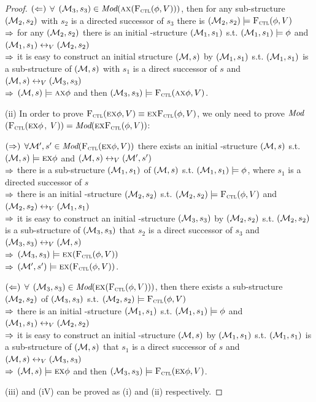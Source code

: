 \documentclass[letterpaper]{article} %
\begin{document}
\begin{proof}
$(\Leftarrow)$ $\forall$ $({\cal M}_3, s_3) \in \textit{Mod}(\textsc{a} \textsc{x} ({\textsc{F}_{\textsc{ctl}}}(\phi,V)))$, then for any sub-structure $({\cal M}_2, s_2)$ with $s_2$ is a directed successor of $s_3$ there is $({\cal M}_2, s_2) \models {\textsc{F}_{\textsc{ctl}}}(\phi,V)$\\
$\Rightarrow$ for any $({\cal M}_2, s_2)$ there is an initial \MPK-structure $({\cal M}_1, s_1)$ s.t. $({\cal M}_1, s_1) \models \phi$ and $({\cal M}_1, s_1) \leftrightarrow_V ({\cal M}_2, s_2)$\\
$\Rightarrow$ it is easy to construct an initial structure $({\cal M},s)$ by $({\cal M}_1, s_1)$ s.t. $({\cal M}_1, s_1)$ is a sub-structure of $({\cal M}, s)$ with $s_1$ is a direct successor of $s$ and $({\cal M}, s)\leftrightarrow_V ({\cal M}_3, s_3)$\\
$\Rightarrow$ $({\cal M}, s) \models \textsc{a} \textsc{x} \phi$ and then $({\cal M}_3, s_3) \models {\textsc{F}_{\textsc{ctl}}}(\textsc{a} \textsc{x} \phi, V)$.


(ii) In order to prove ${\textsc{F}_{\textsc{ctl}}}(\textsc{e} \textsc{x} \phi, V) \equiv \textsc{e}\textsc{x}{\textsc{F}_{\textsc{ctl}}}(\phi, V)$, we only need to prove $\textit{Mod}$ $({\textsc{F}_{\textsc{ctl}}}(\textsc{e} \textsc{x} \phi$, $V)) = \textit{Mod}( \textsc{e}\textsc{x}{\textsc{F}_{\textsc{ctl}}}(\phi, V))$:

$(\Rightarrow)$ $\forall {\cal M}', s' \in \textit{Mod}({\textsc{F}_{\textsc{ctl}}}(\textsc{e} \textsc{x} \phi, V))$ there exists an initial \MPK-structure $({\cal M}, s)$ s.t. $({\cal M}, s) \models \textsc{e} \textsc{x} \phi$ and $({\cal M}, s) \leftrightarrow_V ({\cal M}',s')$\\
$\Rightarrow$ there is a sub-structure $({\cal M}_1, s_1)$ of $({\cal M}, s)$ s.t. $({\cal M}_1, s_1) \models \phi$, where $s_1$ is a directed successor of $s$\\
$\Rightarrow$ there is an initial \MPK-structure $({\cal M}_2, s_2)$ s.t. $({\cal M}_2, s_2) \models {\textsc{F}_{\textsc{ctl}}}(\phi,V)$ and $({\cal M}_2, s_2) \leftrightarrow_V ({\cal M}_1,s_1)$\\
$\Rightarrow$ it is easy to construct an initial \MPK-structure $({\cal M}_3, s_3)$ by $({\cal M}_2, s_2)$ s.t. $({\cal M}_2, s_2)$ is a sub-structure of $({\cal M}_3, s_3)$ that $s_2$ is a direct successor of $s_3$ and $({\cal M}_3, s_3) \leftrightarrow_V ({\cal M},s)$\\
$\Rightarrow$ $({\cal M}_3, s_3) \models \textsc{e} \textsc{x} ({\textsc{F}_{\textsc{ctl}}}(\phi,V))$\\
$\Rightarrow$ $({\cal M}', s') \models \textsc{e} \textsc{x} ({\textsc{F}_{\textsc{ctl}}}(\phi,V))$.

$(\Leftarrow)$ $\forall$ $({\cal M}_3, s_3) \in \textit{Mod}(\textsc{e} \textsc{x} ({\textsc{F}_{\textsc{ctl}}}(\phi,V)))$, then there exists a sub-structure $({\cal M}_2, s_2)$ of $({\cal M}_3, s_3)$ s.t. $({\cal M}_2, s_2) \models {\textsc{F}_{\textsc{ctl}}}(\phi,V)$\\
$\Rightarrow$ there is an initial \MPK-structure $({\cal M}_1, s_1)$ s.t. $({\cal M}_1, s_1) \models \phi$ and $({\cal M}_1, s_1) \leftrightarrow_V ({\cal M}_2, s_2)$\\
$\Rightarrow$ it is easy to construct an initial \MPK-structure $({\cal M},s)$ by $({\cal M}_1, s_1)$ s.t. $({\cal M}_1, s_1)$ is a sub-structure of $({\cal M}, s)$ that $s_1$ is a direct successor of $s$ and $({\cal M}, s)\leftrightarrow_V ({\cal M}_3, s_3)$\\
$\Rightarrow$ $({\cal M}, s) \models \textsc{e} \textsc{x} \phi$ and then $({\cal M}_3, s_3) \models {\textsc{F}_{\textsc{ctl}}}(\textsc{e} \textsc{x} \phi, V)$.



(iii) and (iV) can be proved as (i) and (ii) respectively.
\end{proof}
\end{document}
